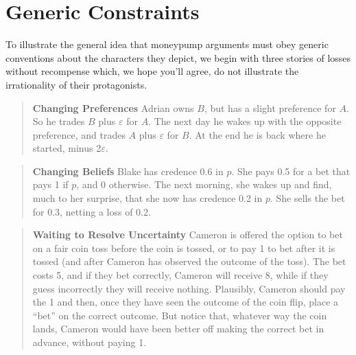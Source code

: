 \documentclass[
  11pt,
  letterpaper,
  DIV=11,
  numbers=noendperiod,
  twoside]{scrartcl}
\begin{document}
\section{Generic Constraints}\label{generic-constraints}

To illustrate the general idea that moneypump arguments must obey
generic conventions about the characters they depict, we begin with
three stories of losses without recompense which, we hope you'll agree,
do not illustrate the irrationality of their protagonists.

\begin{quote}
\textbf{Changing Preferences} Adrian owns \(B\), but has a slight
preference for \(A\). So he trades \(B\) plus \(\varepsilon\) for \(A\).
The next day he wakes up with the opposite preference, and trades \(A\)
plus \(\varepsilon\) for \(B\). At the end he is back where he started,
minus 2\(\varepsilon\).
\end{quote}

\begin{quote}
\textbf{Changing Beliefs} Blake has credence 0.6 in \(p\). She pays 0.5
for a bet that pays 1 if \(p\), and 0 otherwise. The next morning, she
wakes up and find, much to her surprise, that she now has credence 0.2
in \(p\). She sells the bet for 0.3, netting a loss of 0.2.
\end{quote}

\begin{quote}
\textbf{Waiting to Resolve Uncertainty} Cameron is offered the option to
bet on a fair coin toss before the coin is tossed, or to pay 1 to bet
after it is tossed (and after Cameron has observed the outcome of the
toss). The bet costs 5, and if they bet correctly, Cameron will receive
8, while if they guess incorrectly they will receive nothing. Plausibly,
Cameron should pay the 1 and then, once they have seen the outcome of
the coin flip, place a ``bet'' on the correct outcome. But notice that,
whatever way the coin lands, Cameron would have been better off making
the correct bet in advance, without paying 1.
\end{quote}
\end{document}
